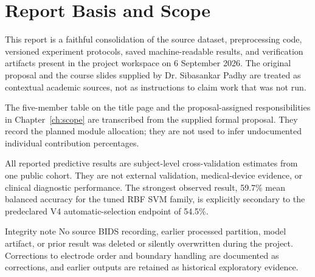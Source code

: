 \chapter*{Report Basis and Scope}

This report is a faithful consolidation of the source dataset, preprocessing code,
versioned experiment protocols, saved machine-readable results, and verification
artifacts present in the project workspace on 6 September 2026. The original
proposal and the course slides supplied by Dr. Sibasankar Padhy are treated as
contextual academic sources, not as instructions to claim work that was not run.

The five-member table on the title page and the proposal-assigned responsibilities
in Chapter~\ref{ch:scope} are transcribed from the supplied formal proposal. They
record the planned module allocation; they are not used to infer undocumented
individual contribution percentages.

All reported predictive results are subject-level cross-validation estimates from
one public cohort. They are not external validation, medical-device evidence, or
clinical diagnostic performance. The strongest observed result, 59.7\% mean
balanced accuracy for the tuned RBF SVM family, is explicitly secondary to the
predeclared V4 automatic-selection endpoint of 54.5\%.

\begin{cautionbox}{Integrity note}
No source BIDS recording, earlier processed partition, model artifact, or prior
result was deleted or silently overwritten during the project. Corrections to
electrode order and boundary handling are documented as corrections, and earlier
outputs are retained as historical exploratory evidence.
\end{cautionbox}

\clearpage
